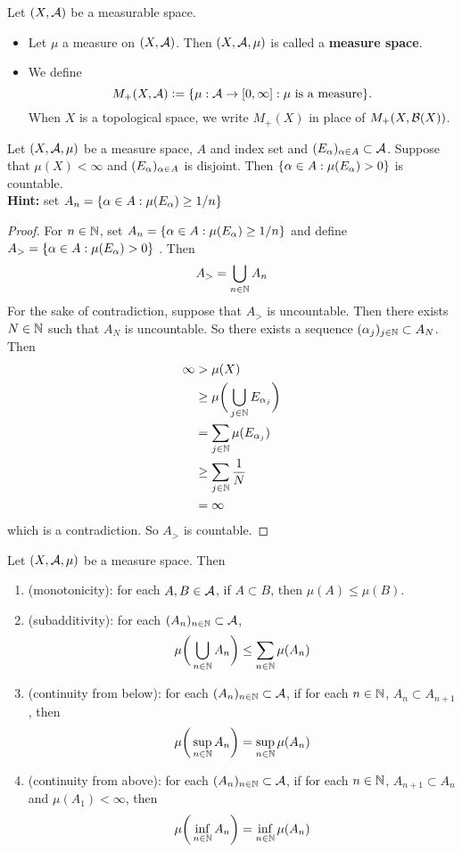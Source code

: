\documentclass{book}
\begin{document}
	\begin{defn} 
		Let $(X,\mathcal{A})$ be a measurable space. 
		\begin{itemize}
			\item Let $\mu$ a measure on $(X, \mathcal{A})$. Then $(X, \mathcal{A}, \mu)$ is called a \textbf{measure space}. 
			\item We define 
			$$M_+(X, \mathcal{A}) \vcentcolon= \{\mu: \mathcal{A} \rightarrow [0,\infty]: \mu \text{ is a measure}\}.$$ 
			When $X$ is a topological space, we write $M_+(X)$ in place of $M_+(X, \mathcal{B}(X))$.
		\end{itemize}
	\end{defn}
	
	\begin{ex} 
	Let $(X, \mathcal{A}, \mu)$ be a measure space, $A$ and index set and $(E_{\alpha})_{\alpha \in A} \subset \mathcal{A}$. Suppose that $\mu(X) < \infty$ and $(E_\alpha)_{\alpha \in A }$ is disjoint. Then $\{\alpha \in A: \mu(E_{\alpha}) >0\}$ is countable.\\
	\textbf{Hint:} set $A_n = \{\alpha \in A: \mu(E_{\alpha}) \geq 1/n \}$ 
	\end{ex}
	
	\begin{proof}
	For $n \in \mathbb{N}$, set $A_n = \{\alpha \in A: \mu(E_{\alpha}) \geq 1/n \}$ and define $ A_> = \{\alpha \in A: \mu(E_{\alpha}) >0\}$ . Then 
	$$A_> = \bigcup_{n \in \mathbb{N}}A_n$$
	For the sake of contradiction, suppose that 
	$A_>$ is uncountable. Then there exists $N \in \mathbb{N}$ such that $A_N$ is uncountable. So there exists a sequence $(\alpha_j)_{j \in \mathbb{N}} \subset A_N$. Then 
	\begin{align*}
	\infty 
	& > \mu(X) \\
	& \geq \mu \bigg( \bigcup_{j \in \mathbb{N}} E_{\alpha_{j}} \bigg) \\
	&= \sum_{j \in \mathbb{N}} \mu(E_{\alpha_j}) \\
	& \geq \sum_{j \in \mathbb{N}} \frac{1}{N} \\
	&= \infty
	\end{align*} 
	which is a contradiction. So $A_>$ is countable.
	\end{proof}
	
	\begin{ex} 
		Let $(X, \mathcal{A}, \mu)$ be a measure space. Then 
		\begin{enumerate}
			\item (monotonicity): for each $A,B \in \mathcal{A}$, if $A \subset B$, then $\mu(A) \leq \mu(B)$.
			\item (subadditivity): for each $(A_n)_{n \in \mathbb{N}} \subset \mathcal{A}$, $$\mu \bigg( \bigcup_{n \in \mathbb{N}} A_n \bigg) \leq \sum_{n \in \mathbb{N}}\mu(A_n)$$
			\item (continuity from below): for each $(A_n)_{n \in \mathbb{N}} \subset \mathcal{A}$, if for each $n \in \mathbb{N}$, $A_n \subset A_{n+1}$, then $$\mu\bigg(\sup_{n \in \mathbb{N}} A_n\bigg) = \sup_{n \in \mathbb{N}}\mu(A_n)$$
			\item (continuity from above): for each $(A_n)_{n \in \mathbb{N}} \subset \mathcal{A}$, if for each $n \in \mathbb{N}$, $ A_{n+1} \subset A_n$ and $\mu(A_1) < \infty$, then $$\mu\bigg(\inf_{n \in \mathbb{N}} A_n\bigg) = \inf_{n \in \mathbb{N}}\mu(A_n)$$
		\end{enumerate}
		
	\end{ex}
	
\end{document}
